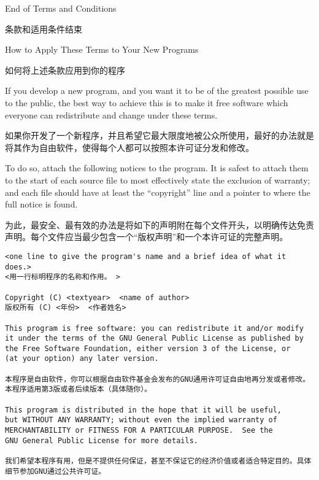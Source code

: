 \documentclass[11pt]{article}
\begin{document}
\begin{enumerate}
        \begin{center}
          {\Large\sc End of Terms and Conditions}

          {\Large 条款和适用条件结束}

          \bigskip
          How to Apply These Terms to Your New Programs

          如何将上述条款应用到你的程序
        \end{center}

        If you develop a new program, and you want it to be of the greatest
        possible use to the public, the best way to achieve this is to make it
        free software which everyone can redistribute and change under these terms.

        如果你开发了一个新程序，并且希望它最大限度地被公众所使用，最好的办法就是将其作为自由软件，使得每个人都可以按照本许可证分发和修改。

        To do so, attach the following notices to the program.  It is safest
        to attach them to the start of each source file to most effectively
        state the exclusion of warranty; and each file should have at least
        the ``copyright'' line and a pointer to where the full notice is found.

        为此，最安全、最有效的办法是将如下的声明附在每个文件开头，以明确传达免责声明。每个文件应当最少包含一个“版权声明”和一个本许可证的完整声明。

          {\footnotesize
            \begin{verbatim}
<one line to give the program's name and a brief idea of what it does.>
<用一行标明程序的名称和作用。 >

Copyright (C) <textyear>  <name of author>
版权所有 (C) <年份>  <作者姓名>

This program is free software: you can redistribute it and/or modify
it under the terms of the GNU General Public License as published by
the Free Software Foundation, either version 3 of the License, or
(at your option) any later version.

本程序是自由软件，你可以根据自由软件基金会发布的GNU通用许可证自由地再分发或者修改。本程序适用第3版或者后续版本（具体随你）。

This program is distributed in the hope that it will be useful,
but WITHOUT ANY WARRANTY; without even the implied warranty of
MERCHANTABILITY or FITNESS FOR A PARTICULAR PURPOSE.  See the
GNU General Public License for more details.

我们希望本程序有用，但是不提供任何保证，甚至不保证它的经济价值或者适合特定目的。具体细节参加GNU通过公共许可证。


\end{verbatim}}
\end{enumerate}
\end{document}
